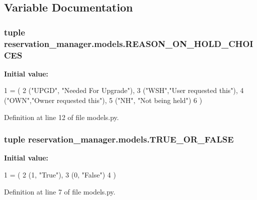 \subsection{Variable Documentation}
\hypertarget{namespacereservation__manager_1_1models_a435b3782f874d82dd97276b49043592c}{
\subsubsection[{R\-E\-A\-S\-O\-N\-\_\-\-O\-N\-\_\-\-H\-O\-L\-D\-\_\-\-C\-H\-O\-I\-C\-E\-S}]{\setlength{\rightskip}{0pt plus 5cm}tuple reservation\-\_\-manager.\-models.\-R\-E\-A\-S\-O\-N\-\_\-\-O\-N\-\_\-\-H\-O\-L\-D\-\_\-\-C\-H\-O\-I\-C\-E\-S}}\label{namespacereservation__manager_1_1models_a435b3782f874d82dd97276b49043592c}
{\bfseries Initial value\-:}
\begin{DoxyCode}
1 = (
2     (\textcolor{stringliteral}{"UPGD"}, \textcolor{stringliteral}{"Needed For Upgrade"}),
3     (\textcolor{stringliteral}{"WSH"},\textcolor{stringliteral}{"User requested this"}),
4     (\textcolor{stringliteral}{"OWN"},\textcolor{stringliteral}{"Owner requested this"}),
5     (\textcolor{stringliteral}{"NH"}, \textcolor{stringliteral}{"Not being held"})
6 )
\end{DoxyCode}


Definition at line 12 of file models.\-py.

\hypertarget{namespacereservation__manager_1_1models_af585bf5affae3c2f4d6f7ee54371a0ec}{
\subsubsection[{T\-R\-U\-E\-\_\-\-O\-R\-\_\-\-F\-A\-L\-S\-E}]{\setlength{\rightskip}{0pt plus 5cm}tuple reservation\-\_\-manager.\-models.\-T\-R\-U\-E\-\_\-\-O\-R\-\_\-\-F\-A\-L\-S\-E}}\label{namespacereservation__manager_1_1models_af585bf5affae3c2f4d6f7ee54371a0ec}
{\bfseries Initial value\-:}
\begin{DoxyCode}
1 = (
2     (1, \textcolor{stringliteral}{"True"}),
3     (0, \textcolor{stringliteral}{"False"})
4 )
\end{DoxyCode}


Definition at line 7 of file models.\-py.

